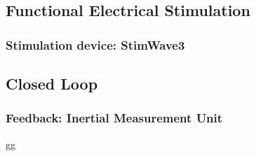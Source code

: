 \subsection{Functional Electrical Stimulation}

\subsubsection{Stimulation device: StimWave3}

\subsection{Closed Loop}

\subsubsection{Feedback: Inertial Measurement Unit}



gg
